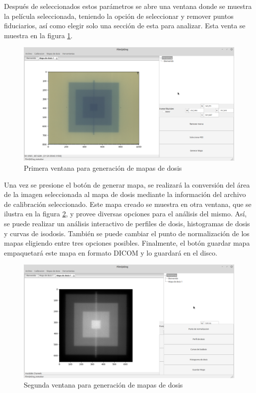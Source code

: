 Después de seleccionados estos parámetros se abre una ventana donde se muestra la película seleccionada, teniendo la opción de seleccionar y remover puntos fiduciarios, así como elegir solo una sección de esta para analizar. Esta venta se muestra en la figura \ref{fig:ventanaMapaDosis1}.\\
\begin{figure}[H]
	\centering
	\includegraphics[width=0.7\linewidth]{images/imagenesDocumentacion/ventanaMapaDosis.png}
	\caption{Primera ventana para generación de mapas de dosis }
	\label{fig:ventanaMapaDosis1}
\end{figure}

Una vez se presione el botón de generar mapa, se realizará la conversión del área de la imagen seleccionada al mapa de dosis mediante la información del archivo de calibración seleccionado. Este mapa creado se muestra en otra ventana, que se ilustra en la figura \ref{fig:ventanaMapaDosis2}, y provee diversas opciones para el análisis del mismo. Así, se puede realizar un análisis interactivo de perfiles de dosis, histogramas de dosis y curvas de isodosis. También se puede cambiar el punto de normalización de los mapas eligiendo entre tres opciones posibles. Finalmente, el botón guardar mapa empaquetará este mapa en formato DICOM y lo guardará en el disco.\\

\begin{figure}[H]
	\centering
	\includegraphics[width=0.7\linewidth]{images/imagenesDocumentacion/ventanaMapaDosis2.png}
	\caption{Segunda ventana para generación de mapas de dosis }
	\label{fig:ventanaMapaDosis2}
\end{figure}

